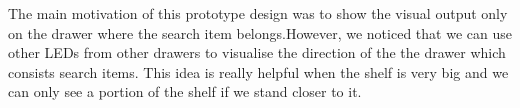 The main motivation of this prototype design was to show the visual output only on the drawer where the search item belongs.However, we noticed that we can use other LEDs from other drawers to visualise the direction of the the drawer which consists search items. This idea is really helpful when the shelf is very big and we can only see a  portion of the shelf if we stand closer to it.